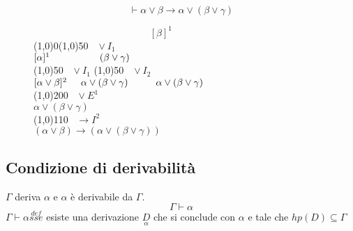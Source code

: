 \documentclass{article}
\theoremstyle{break}
\theoremstyle{break}
\theoremstyle{break}
\theoremstyle{break}
\begin{document}
\begin{figure}[H]
    \begin{exercise}
                \[
            \vdash \alpha \vee \beta \to \alpha \vee (\beta \vee \gamma)
        \] 
        \begin{center}
            \( \hspace{5cm} [\beta]^1 \)\\ 
            \line(1,0){0}\hspace{6cm}\line(1,0){50}\(\;\;\; \vee I_1 \)\\
            \hspace{2.2cm}\( [\alpha]^1 \hspace{1.8cm} (\beta \vee \gamma) \) \\
            \hspace{3cm}\line(1,0){50}\(\;\;\; \vee I_1 \) \hspace{0.2cm}\line(1,0){50}\(\;\;\; \vee I_2 \)\\  
            \( [\alpha \vee \beta]^2 \hspace{0.5cm} \alpha \vee (\beta \vee \gamma) \hspace{1cm} \alpha \vee (\beta \vee \gamma) \) \\
            \hspace{0.9cm}\line(1,0){200}\(\;\;\; \vee E^1 \)\\  
            \( \alpha \vee (\beta \vee \gamma)\)\\
            \hspace{0.9cm}\line(1,0){110}\(\;\;\; \to I^2 \)\\  
            \( (\alpha \vee \beta) \to (\alpha \vee (\beta \vee \gamma)) \) 
        \end{center}
    \end{exercise}
\end{figure}

\subsection{Condizione di derivabilità}
\( \Gamma \) deriva \( \alpha \) e \( \alpha \) è derivabile da \( \Gamma \).
\[
\Gamma \vdash \alpha
\] 
\(
    \Gamma \vdash \alpha \stackrel{def}{sse}
    \) esiste una derivazione \(\underset{\alpha}{D}\) che si conclude con \( \alpha \) e
    tale che \( hp(D) \subseteq \Gamma \) 
\end{document}
